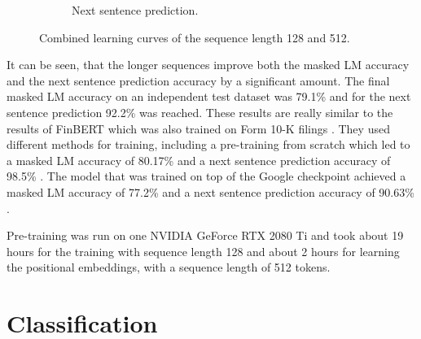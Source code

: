 \begin{figure}[h]
\begin{subfigure}{0.5\textwidth}
        \caption{Next sentence prediction.}
        \label{figure:bert_pretraining_learning_512_nsp}
    \end{subfigure}
    \caption{Combined learning curves of the sequence length 128 and 512.}
    \label{figure:bert_pretraining_learning_512}
\end{figure}
It can be seen, that the longer sequences improve both the masked LM accuracy and the next sentence prediction accuracy by a significant amount.
The final masked LM accuracy on an independent test dataset was 79.1\% and for the next sentence prediction 92.2\% was reached.
These results are really similar to the results of FinBERT which was also trained on Form 10-K filings \cite[p. 4]{DeSola2019}.
They used different methods for training, including a pre-training from scratch which led to a masked LM accuracy of 80.17\% and a next sentence prediction accuracy of 98.5\% \cite[p. 7]{DeSola2019}.
The model that was trained on top of the Google checkpoint achieved a masked LM accuracy of 77.2\% and a next sentence prediction accuracy of 90.63\% \cite[p. 7]{DeSola2019}.

Pre-training was run on one NVIDIA GeForce RTX 2080 Ti and took about 19 hours for the training with sequence length 128 and about 2 hours for learning the positional embeddings, with a sequence length of 512 tokens.

\section{Classification}
\label{sec:report_classification}

